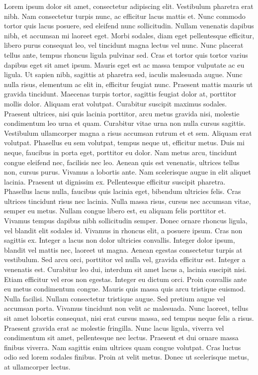 \documentclass[a4paper]{memoir}
\begin{document}
Lorem ipsum dolor sit amet, consectetur adipiscing elit. Vestibulum pharetra erat nibh. Nam consectetur turpis nunc, ac efficitur lacus mattis et. Nunc commodo tortor quis lacus posuere, sed eleifend nunc sollicitudin. Nullam venenatis dapibus nibh, et accumsan mi laoreet eget. Morbi sodales, diam eget pellentesque efficitur, libero purus consequat leo, vel tincidunt magna lectus vel nunc. Nunc placerat tellus ante, tempus rhoncus ligula pulvinar sed. Cras et tortor quis tortor varius dapibus eget sit amet ipsum. Mauris eget est ac massa tempor vulputate ac eu ligula.
Ut sapien nibh, sagittis at pharetra sed, iaculis malesuada augue. Nunc nulla risus, elementum ac elit in, efficitur feugiat nunc. Praesent mattis mauris ut gravida tincidunt. Maecenas turpis tortor, sagittis feugiat dolor at, porttitor mollis dolor. Aliquam erat volutpat. Curabitur suscipit maximus sodales. Praesent ultrices, nisi quis lacinia porttitor, arcu metus gravida nisi, molestie condimentum leo urna et quam.
Curabitur vitae urna non nulla cursus sagittis. Vestibulum ullamcorper magna a risus accumsan rutrum et et sem. Aliquam erat volutpat. Phasellus eu sem volutpat, tempus neque ut, efficitur metus. Duis mi neque, faucibus in porta eget, porttitor eu dolor. Nam metus arcu, tincidunt congue eleifend nec, facilisis nec leo. Aenean quis est venenatis, ultrices tellus non, cursus purus. Vivamus a lobortis ante. Nam scelerisque augue in elit aliquet lacinia. Praesent ut dignissim ex. Pellentesque efficitur suscipit pharetra. Phasellus lacus nulla, faucibus quis lacinia eget, bibendum ultricies felis. Cras ultrices tincidunt risus nec lacinia. Nulla massa risus, cursus nec accumsan vitae, semper eu metus. Nullam congue libero est, eu aliquam felis porttitor et. Vivamus tempus dapibus nibh sollicitudin semper.
Donec ornare rhoncus ligula, vel blandit elit sodales id. Vivamus in rhoncus elit, a posuere ipsum. Cras non sagittis ex. Integer a lacus non dolor ultricies convallis. Integer dolor ipsum, blandit vel mattis nec, laoreet ut magna. Aenean egestas consectetur turpis at vestibulum. Sed arcu orci, porttitor vel nulla vel, gravida efficitur est. Integer a venenatis est. Curabitur leo dui, interdum sit amet lacus a, lacinia suscipit nisi. Etiam efficitur vel eros non egestas. Integer eu dictum orci. Proin convallis ante eu metus condimentum congue. Mauris quis massa quis arcu tristique euismod. Nulla facilisi. Nullam consectetur tristique augue.
Sed pretium augue vel accumsan porta. Vivamus tincidunt non velit ac malesuada. Nunc laoreet, tellus sit amet lobortis consequat, nisi erat cursus massa, sed tempus neque felis a risus. Praesent gravida erat ac molestie fringilla. Nunc lacus ligula, viverra vel condimentum sit amet, pellentesque nec lectus. Praesent et dui ornare massa finibus viverra. Nam sagittis enim ultrices quam congue volutpat. Cras luctus odio sed lorem sodales finibus. Proin at velit metus. Donec ut scelerisque metus, at ullamcorper lectus.
\end{document}
